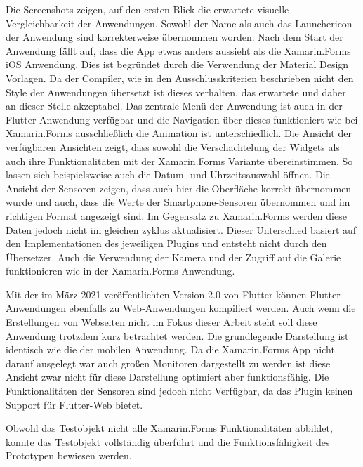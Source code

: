 Die Screenshots zeigen,  auf den ersten Blick die erwartete visuelle Vergleichbarkeit der Anwendungen.  Sowohl der Name als auch das Launchericon der Anwendung sind korrekterweise übernommen worden.  Nach dem Start der Anwendung fällt auf,  dass die App etwas anders aussieht als die Xamarin.Forms iOS Anwendung.  Dies ist begründet durch die Verwendung der Material Design Vorlagen.  Da der Compiler, wie in den Ausschlusskriterien beschrieben nicht den Style der Anwendungen übersetzt ist dieses verhalten,  das erwartete und daher an dieser Stelle akzeptabel.  Das zentrale Menü der Anwendung ist auch in der Flutter Anwendung verfügbar und die Navigation über dieses funktioniert wie bei Xamarin.Forms ausschließlich die Animation ist unterschiedlich.  Die Ansicht der verfügbaren Ansichten zeigt, dass sowohl die Verschachtelung der Widgets als auch ihre Funktionalitäten mit der Xamarin.Forms Variante übereinstimmen.  So lassen sich beispielsweise auch die Datum- und Uhrzeitsauswahl öffnen. 
Die Ansicht der Sensoren zeigen,  dass auch hier die Oberfläche korrekt übernommen wurde und auch,  dass die Werte der Smartphone-Sensoren übernommen und im richtigen Format angezeigt sind.  Im Gegensatz zu Xamarin.Forms werden diese Daten jedoch nicht im gleichen zyklus aktualisiert.  Dieser Unterschied basiert auf den Implementationen des jeweiligen Plugins und entsteht nicht durch den Übersetzer.  Auch die Verwendung der Kamera und der Zugriff auf die Galerie funktionieren wie in der Xamarin.Forms Anwendung. 

Mit der im März 2021 veröffentlichten Version 2.0 von Flutter können Flutter Anwendungen ebenfalls zu Web-Anwendungen kompiliert werden.  Auch wenn die Erstellungen von Webseiten nicht im Fokus dieser Arbeit steht soll diese Anwendung trotzdem kurz betrachtet werden.  Die grundlegende Darstellung ist identisch wie die der mobilen Anwendung.  Da die Xamarin.Forms App nicht darauf ausgelegt war auch großen Monitoren dargestellt zu werden ist diese Ansicht zwar nicht für diese Darstellung optimiert aber funktionsfähig.  Die Funktionalitäten der Sensoren sind jedoch nicht Verfügbar, da das Plugin keinen Support für Flutter-Web bietet. 

Obwohl das Testobjekt nicht alle  Xamarin.Forms Funktionalitäten abbildet,  konnte das Testobjekt vollständig überführt und die Funktionsfähigkeit des Prototypen bewiesen werden.  

